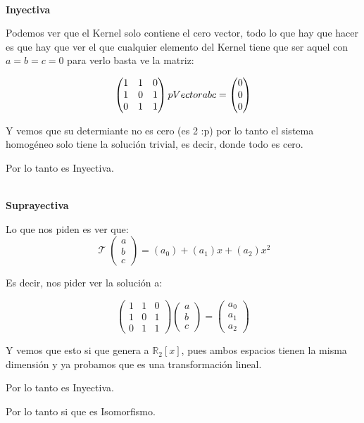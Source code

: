\documentclass[12pt]{report}                                    %
\DeclareMathOperator \LinealTransformation {\mathcal{T}}        %
\newcommand{\pVector}[1]{                                       %
        \ensuremath{\begin{pmatrix}#1\end{pmatrix}}                 %
    }
\begin{document}
            \textbf{\\Inyectiva}

            Podemos ver que el Kernel solo contiene el cero vector, todo lo que hay que hacer es
            que hay que ver el que cualquier elemento del Kernel tiene que ser aquel con $a=b=c=0$
            para verlo basta ve la matriz:

            \begin{equation*}
                \pVector{1&1&0\\1&0&1\\0&1&1} pVector{a\\b\\c} = \pVector{0\\0\\0}
            \end{equation*}

            Y vemos que su determiante no es cero (es 2 :p) por lo tanto el sistema homogéneo solo
            tiene la solución trivial, es decir, donde todo es cero.

            Por lo tanto es Inyectiva.

            \textbf{\\Suprayectiva}

            Lo que nos piden es ver que:
            \begin{equation*}
                \LinealTransformation \pVector{a\\b\\c} = (a_0) +(a_1)x+(a_2)x^2
            \end{equation*}

            Es decir, nos pider ver la solución a:

            \begin{equation*}
                \pVector{1&1&0\\1&0&1\\0&1&1} \pVector{a\\b\\c} = \pVector{a_0\\a_1\\a_2}
            \end{equation*}

            Y vemos que esto si que genera a $\mathbb{R}_2[x]$, pues ambos espacios tienen la misma dimensión
            y ya probamos que es una transformación lineal.

            Por lo tanto es Inyectiva.  

            Por lo tanto si que es Isomorfismo.   
\end{document}
